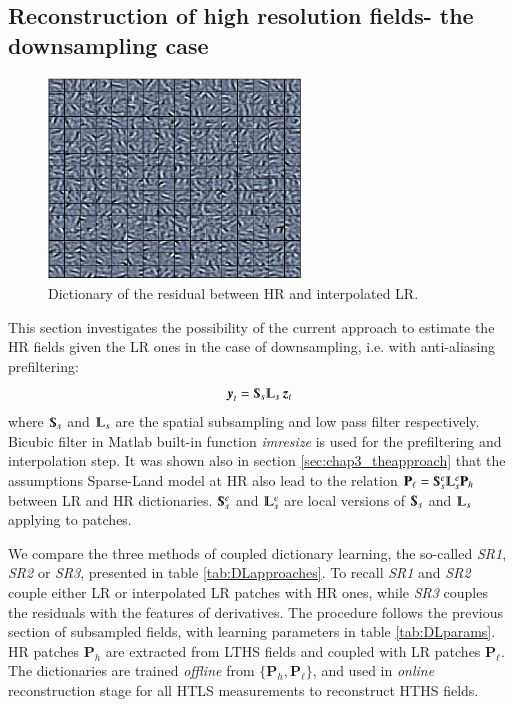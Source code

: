 \subsection{Reconstruction of high resolution fields- the downsampling case}
\begin{figure}
	\centering
	\includegraphics[width=0.6\textwidth]{./images/DL/SR_sspacing04/downsampling/dictionary_couplefeatures_patchesHR.eps}
	\caption{Dictionary of the residual between HR and interpolated LR.}
	\label{fig:SR_dictionary_residual}
\end{figure}

This section investigates the possibility of the current approach to estimate the HR fields given the LR ones in the case of downsampling, i.e. with anti-aliasing prefiltering:
\begin{equation}
\y_t = \Sub_s \LPF_s \z_t
\end{equation}
where $ \Sub_s $ and $ \LPF_s $ are the spatial subsampling and low pass filter respectively. Bicubic filter in Matlab built-in function \textit{imresize} is used for the prefiltering and interpolation step. It was shown also in section \ref{sec:chap3_theapproach} that the assumptions Sparse-Land model at HR also lead to the relation $ \mathbf{P}_\ell =  \Sub_s^\ext \LPF_s^\ext \mathbf{P}_h$ between LR and HR dictionaries. $ \Sub_s^\ext $ and $ \LPF_s^\ext $ are local versions of $ \Sub_s $ and $ \LPF_s $ applying to patches. 

We compare the three methods of coupled dictionary learning, the so-called \textit{SR1}, \textit{SR2} or \textit{SR3}, presented in table \ref{tab:DLapproaches}. To recall \textit{SR1} and \textit{SR2} couple either LR or interpolated LR patches with HR ones, while \textit{SR3} couples the residuals with the features of derivatives. The procedure follows the previous section of subsampled fields, with learning parameters in table \ref{tab:DLparams}. HR patches $ \mathbf{P}_h$ are extracted from LTHS fields and coupled with LR patches $ \mathbf{P}_\ell$. The dictionaries are trained \textit{offline} from $ \{\mathbf{P}_h, \mathbf{P}_\ell\}$, and used in \textit{online} reconstruction stage for all HTLS measurements to reconstruct HTHS fields. 

